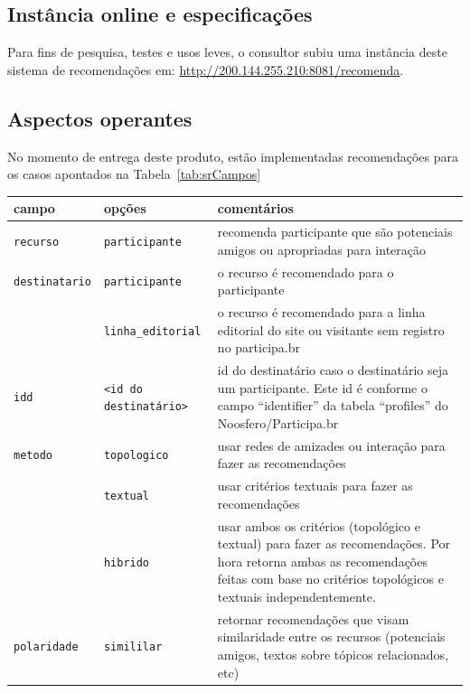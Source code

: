 \documentclass[12pt]{article}
\begin{document}
\subsection{Instância online e especificações}
Para fins de pesquisa, testes e usos leves, o consultor subiu uma instância deste sistema de recomendações em:
\url{http://200.144.255.210:8081/recomenda}. 
\subsection{Aspectos operantes}
No momento de entrega deste produto, estão implementadas recomendações para os casos apontados na Tabela~\ref{tab:srCampos}

\begin{table}
\begin{center}
\begin{tabular}{|l|l|p{10cm}|}\hline
\textbf{campo} & \textbf{opções} & \textbf{comentários} \\\hline\hline
\texttt{recurso}       & \texttt{participante} & recomenda participante que são potenciais amigos ou apropriadas para interação \\\hline
\texttt{destinatario}  & \texttt{participante} & o recurso é recomendado para o participante                  \\
                       & \texttt{linha\_editorial} & o recurso é recomendado para a linha editorial do site ou visitante sem registro no participa.br              \\\hline
\texttt{idd}           & \texttt{<id do destinatário>} & {\raggedright id do destinatário caso o destinatário seja um participante. Este id é conforme o campo ``identifier'' da tabela ``profiles'' do Noosfero/Participa.br}           \\\hline
\texttt{metodo}        & \texttt{topologico}  & usar redes de amizades ou interação para fazer as recomendações                   \\
                       & \texttt{textual}    &  usar critérios textuais para fazer as recomendações                   \\
                       & \texttt{hibrido}    &  {\raggedright usar ambos os critérios (topológico e textual) para fazer as recomendações. Por hora retorna ambas as recomendações feitas com base no critérios topológicos e textuais independentemente.} \\\hline
\texttt{polaridade}    & \texttt{simililar}  & retornar recomendações que visam similaridade entre os recursos (potenciais amigos, textos sobre tópicos relacionados, etc)                    \\

\end{tabular}
\end{center}
\end{table}
\end{document}
